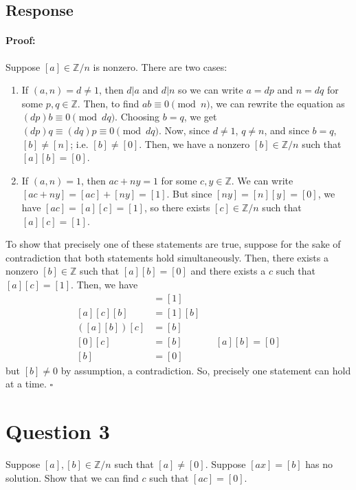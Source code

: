 \documentclass [12pt] {article}
\newcommand{\Z}{\mathbb{Z}}
\newenvironment{proof}{\paragraph{Proof:}}{\hfill$\square$}
\begin{document}
\subsection*{Response}
\begin{proof}
    Suppose $[a] \in \Z/n$ is nonzero. There are two cases:
    \begin{enumerate}[label=\it{Case \roman*:},leftmargin=*]
        \item If $(a, n) = d \neq 1$, then $d | a$ and $d | n$ so we can write $a = dp$ and $n = dq$ for
            some $p, q \in \Z$. Then, to find $ab \equiv 0 \pmod{n}$, we can rewrite the equation
            as $(dp)b \equiv 0 \pmod{dq}$. Choosing $b = q$, we get 
            $(dp)q \equiv (dq)p \equiv 0 \pmod{dq}$. Now, since $d \neq 1$, $q \neq n$, and since $b = q$,
            $[b] \neq [n]$; i.e. $[b] \neq [0]$. Then, we have a nonzero $[b] \in \Z/n$ such that
            $[a][b] = [0]$.
        \item If $(a, n) = 1$, then $ac + ny = 1$ for some $c, y \in \Z$. We can write
            $[ac + ny] = [ac] + [ny] = [1]$. But since $[ny] = [n][y] = [0]$, we have
            $[ac] = [a][c] = [1]$, so there exists $[c] \in \Z/n$ such that $[a][c] = [1]$.
    \end{enumerate}
    To show that precisely one of these statements are true, suppose for the sake of contradiction
    that both statements hold simultaneously. Then, there exists a nonzero $[b] \in \Z$ such that
    $[a][b] = [0]$ and there exists a $c$ such that $[a][c] = [1]$. Then, we have
    \begin{align*}
        [a][c] &= [1] \\
        [a][c][b] &= [1][b] \\
        ([a][b])[c] &= [b] \\
        [0][c] &= [b] && [a][b] = [0] \\
        [b] &= [0] 
    \end{align*}
    but $[b] \neq 0$ by assumption, a contradiction. So, precisely one statement can hold at a time.
\end{proof}
\newpage

\section*{Question 3}
Suppose $[a],[b]\in\Z/n$ such that $[a]\neq [0]$. Suppose $[ax]=[b]$ has no solution. Show that we 
can find $c$ such that $[ac]=[0]$. 
\end{document}

